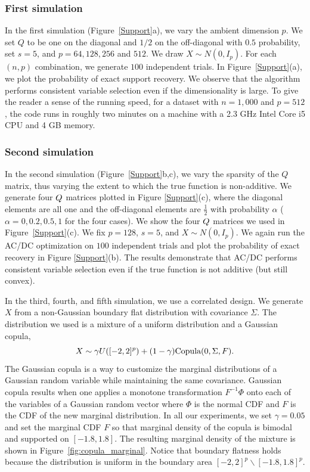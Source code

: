 \subsubsection{First simulation}
In the \textrm{first simulation} (Figure~\ref{Support}a), we vary the
ambient dimension $p$. We set $Q$ to be one on the diagonal and $1/2$ on
the off-diagonal with $0.5$ probability, set $s=5$, and $p=64,128,256$
and $512$. We draw $X \sim N(0, I_p)$.  For each $(n,p)$ combination,
we generate $100$ independent trials.  In Figure~\ref{Support}(a), we
plot the probability of exact support recovery. We observe that the
algorithm performs consistent variable selection even if the
dimensionality is large. To give the reader a sense of the running
speed, for a dataset with $n=1{,}000$ and $p=512$, the code runs in
roughly two minutes on a machine with a 2.3 GHz Intel Core i5 CPU and 4
GB memory.


\subsubsection{Second simulation}
In the \textrm{second simulation} (Figure~\ref{Support}b,c), we vary
the sparsity of the $Q$ matrix, thus varying the extent to which
the true function is non-additive. We generate four $Q$ matrices
plotted in Figure \ref{Support}(c), where the diagonal elements are
all one and the off-diagonal elements are $\frac{1}{2}$ with
probability $\alpha$ ($\alpha=0,0.2,0.5,1$ for the four cases). We
show the four $Q$ matrices we used in Figure~\ref{Support}(c).  We fix
$p=128$, $s=5$, and $X \sim N(0,I_p)$.  We again run the AC/DC
optimization on $100$ independent trials and plot the probability of
exact recovery in Figure \ref{Support}(b). The results demonstrate
that AC/DC performs consistent variable selection even if the true
function is not additive (but still convex).

In the third, fourth, and fifth simulation, we use a correlated
design. We generate $X$ from a non-Gaussian boundary flat distribution
with covariance $\Sigma$. The distribution we used is a mixture of a
uniform distribution and a Gaussian copula,
\[
X \sim \gamma U([-2, 2]^p) + (1-\gamma) \textrm{Copula}(0, \Sigma, F).
\]
The Gaussian copula is a way to customize the marginal distributions of a Gaussian random variable while maintaining the same covariance. Gaussian copula results when one applies a monotone transformation $F^{-1} \Phi$ onto each of the variables of a Gaussian random vector where $\Phi$ is the normal CDF and $F$ is the CDF of the new marginal distribution. In all our experiments, we set $\gamma = 0.05$ and set the marginal CDF $F$ so that marginal density of the copula is bimodal and supported on $[-1.8, 1.8]$. The resulting marginal density of the mixture is shown in Figure~\ref{fig:copula_marginal}. Notice that boundary flatness holds because the distribution is uniform in the boundary area $[-2,2]^p \backslash [-1.8, 1.8]^p$.

